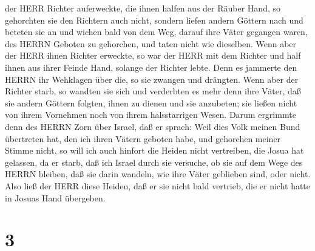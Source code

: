 der HERR Richter auferweckte, die ihnen halfen aus der Räuber Hand,
 so gehorchten sie den Richtern auch nicht, sondern liefen
andern Göttern nach und beteten sie an und wichen bald von dem Weg,
darauf ihre Väter gegangen waren, des HERRN Geboten zu gehorchen, und
taten nicht wie dieselben.  Wenn aber der HERR ihnen
Richter erweckte, so war der HERR mit dem Richter und half ihnen aus
ihrer Feinde Hand, solange der Richter lebte. Denn es jammerte den HERRN
ihr Wehklagen über die, so sie zwangen und drängten.  Wenn
aber der Richter starb, so wandten sie sich und verderbten es mehr denn
ihre Väter, daß sie andern Göttern folgten, ihnen zu dienen und sie
anzubeten; sie ließen nicht von ihrem Vornehmen noch von ihrem
halsstarrigen Wesen.  Darum ergrimmte denn des HERRN Zorn
über Israel, daß er sprach: Weil dies Volk meinen Bund übertreten hat,
den ich ihren Vätern geboten habe, und gehorchen meiner Stimme nicht,
 so will ich auch hinfort die Heiden nicht vertreiben, die
Josua hat gelassen, da er starb,  daß ich Israel durch sie
versuche, ob sie auf dem Wege des HERRN bleiben, daß sie darin wandeln,
wie ihre Väter geblieben sind, oder nicht.  Also ließ der
HERR diese Heiden, daß er sie nicht bald vertrieb, die er nicht hatte in
Josuas Hand übergeben.

\hypertarget{section-2}{%
\section{3}\label{section-2}}

